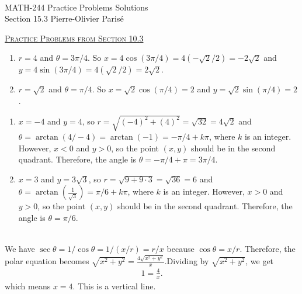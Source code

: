 


	\noindent \hrulefill \\
	MATH-244 \semester \hfill Practice Problems Solutions\\
	Section 15.3 \hfill Pierre-Olivier Paris{\'e} \\\vspace*{-1cm}
	
	\noindent\hrulefill
	
	\spc

	\underline{\textsc{Practice Problems from Section 10.3}}

	\vspace*{-0.5cm}
	\begin{enumerate}[label=\alph*)]
		\item $r = 4$ and $\theta = 3\pi / 4$. So $x = 4 \cos (3 \pi /4) = 4 (-\sqrt{2}/2) = -2 \sqrt{2}$ and $y = 4 \sin (3 \pi / 4) = 4 (\sqrt{2} / 2) = 2 \sqrt{2}$.
		\item $r = \sqrt{2}$ and $\theta = \pi /4$. So $x = \sqrt{2} \cos (\pi /4) = 2$ and $y = \sqrt{2} \sin (\pi /4 ) = 2$.
	\end{enumerate}	

	\vspace*{-0.5cm}
	\begin{enumerate}[label=\alph*)]
		\item $x = -4$ and $y = 4$, so $r = \sqrt{(-4)^2 + (4)^2} = \sqrt{32} = 4 \sqrt{2}$ and $\theta = \arctan (4 / -4) = \arctan (-1) = - \pi / 4 + k \pi$, where $k$ is an integer. However, $x < 0$ and $y >0$, so the point $(x, y)$ should be in the second quadrant. Therefore, the angle is $\theta = -\pi/ 4 + \pi = 3\pi /4$.
		\item $x = 3$ and $y= 3 \sqrt{3}$, so $r = \sqrt{9 + 9 \cdot 3} = \sqrt{36} = 6$ and $\theta = \arctan (\frac{1}{\sqrt{3}}) = \pi / 6 + k \pi$, where $k$ is an integer. However, $x > 0$ and $y > 0$, so the point $(x, y)$ should be in the second quadrant. Therefore, the angle is $\theta = \pi / 6$. 
	\end{enumerate}

	\\
	We have $\sec \theta = 1/ \cos \theta = 1/ (x/r) = r /x$ because $\cos \theta = x/r$. Therefore, the polar equation becomes $\sqrt{x^2 + y^2} = \frac{4\sqrt{x^2 + y^2}}{x}$.Dividing by $\sqrt{x^2 + y^2}$, we get
		\begin{align*}
		1 = \frac{4}{x} .
		\end{align*}
	which means $x = 4$. This is a vertical line.

